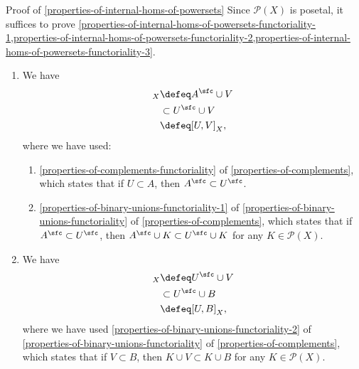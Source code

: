 \begin{Proof}{Proof of \cref{properties-of-internal-homs-of-powersets}}%
    Since $\mathcal{P}(X)$ is posetal, it suffices to prove \cref{properties-of-internal-homs-of-powersets-functoriality-1,properties-of-internal-homs-of-powersets-functoriality-2,properties-of-internal-homs-of-powersets-functoriality-3}.
    \begin{enumerate}
        \item\label{proof-of-properties-of-internal-homs-of-powersets-1}We have
            \begin{align*}
                [A,V]_{X} &\defeq  A^{\sfc}\cup V\\
                          &\subset U^{\sfc}\cup V\\
                          &\defeq [U,V]_{X},
            \end{align*}
            where we have used:
            \begin{enumerate}
                \item\label{proof-of-properties-of-internal-homs-of-powersets-1-a}\cref{properties-of-complements-functoriality} of \cref{properties-of-complements}, which states that if $U\subset A$, then $A^{\sfc}\subset U^{\sfc}$.
                \item\label{proof-of-properties-of-internal-homs-of-powersets-1-b}\cref{properties-of-binary-unions-functoriality-1} of \cref{properties-of-binary-unions-functoriality} of \cref{properties-of-complements}, which states that if $A^{\sfc}\subset U^{\sfc}$, then $A^{\sfc}\cup K\subset U^{\sfc}\cup K$ for any $K\in\mathcal{P}(X)$.
            \end{enumerate}
        \item\label{proof-of-properties-of-internal-homs-of-powersets-2}We have
            \begin{align*}
                [U,V]_{X} &\defeq  U^{\sfc}\cup V\\
                          &\subset U^{\sfc}\cup B\\
                          &\defeq [U,B]_{X},
            \end{align*}
            where we have used \cref{properties-of-binary-unions-functoriality-2} of \cref{properties-of-binary-unions-functoriality} of \cref{properties-of-complements}, which states that if $V\subset B$, then $K\cup V\subset K\cup B$ for any $K\in\mathcal{P}(X)$.

\end{enumerate}
\end{Proof}
